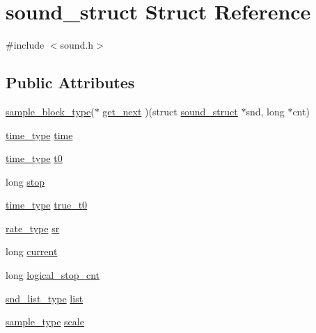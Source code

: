 \hypertarget{structsound__struct}{}\section{sound\+\_\+struct Struct Reference}
\label{structsound__struct}


{\ttfamily \#include $<$sound.\+h$>$}

\subsection*{Public Attributes}
\begin{DoxyCompactItemize}
\item 
\hyperlink{sound_8h_a6becaef7eb98c0e45b13f72dadf07b23}{sample\+\_\+block\+\_\+type}($\ast$ \hyperlink{structsound__struct_ab03f6655f85673276f9a8bdc4affd358}{get\+\_\+next} )(struct \hyperlink{structsound__struct}{sound\+\_\+struct} $\ast$snd, long $\ast$cnt)
\item 
\hyperlink{midifns_8h_a3f787491db5dbc75c21b27d54e9ebae6}{time\+\_\+type} \hyperlink{structsound__struct_a39c436490de5c9d9020a3c13cfdabcd2}{time}
\item 
\hyperlink{midifns_8h_a3f787491db5dbc75c21b27d54e9ebae6}{time\+\_\+type} \hyperlink{structsound__struct_a397d52ba2da4602200e85f49f62f28ea}{t0}
\item 
long \hyperlink{structsound__struct_a95baf30b19741f4b7115900fb648c716}{stop}
\item 
\hyperlink{midifns_8h_a3f787491db5dbc75c21b27d54e9ebae6}{time\+\_\+type} \hyperlink{structsound__struct_a7ec06c0b9e77d0e2ecd993df9f8eb6e3}{true\+\_\+t0}
\item 
\hyperlink{sound_8h_a80a6a98ce803ce7a00e744aa2103f9a1}{rate\+\_\+type} \hyperlink{structsound__struct_aafecd01e13520f7fb83fe8e2ac2cd026}{sr}
\item 
long \hyperlink{structsound__struct_a36de08aa7f68cf01c3f197548bc3e00f}{current}
\item 
long \hyperlink{structsound__struct_a51e65ef2c1784b5bc543a84ec90d5022}{logical\+\_\+stop\+\_\+cnt}
\item 
\hyperlink{sound_8h_ab05388854adb60c2855a70276d2ceb65}{snd\+\_\+list\+\_\+type} \hyperlink{structsound__struct_abe0c2ecf4e89d7d8e679adb01442fd60}{list}
\item 
\hyperlink{sound_8h_a3a9d1d4a1c153390d2401a6e9f71b32c}{sample\+\_\+type} \hyperlink{structsound__struct_a7531e5d5bc141fa994e5d787bb2dea01}{scale}
\item 

\end{DoxyCompactItemize}
